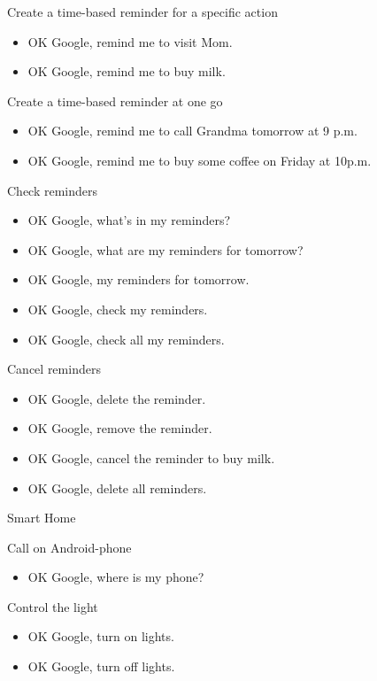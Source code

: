 \documentclass[
  a4paper,
]{article}
\providecommand{\tightlist}{%
  \setlength{\itemsep}{0pt}\setlength{\parskip}{0pt}}\usepackage{longtable,booktabs,array}
\begin{document}
Create a time-based reminder for a specific action

\begin{itemize}
\item
  OK Google, remind me to visit Mom.
\item
  OK Google, remind me to buy milk.
\end{itemize}

Create a time-based reminder at one go

\begin{itemize}
\item
  OK Google, remind me to call Grandma tomorrow at 9 p.m.
\item
  OK Google, remind me to buy some coffee on Friday at 10p.m.
\end{itemize}

Check reminders

\begin{itemize}
\item
  OK Google, what's in my reminders?
\item
  OK Google, what are my reminders for tomorrow?
\item
  OK Google, my reminders for tomorrow.
\item
  OK Google, check my reminders.
\item
  OK Google, check all my reminders.~~
\end{itemize}

Cancel reminders

\begin{itemize}
\item
  OK Google, delete the reminder.
\item
  OK Google, remove the reminder.
\item
  OK Google, cancel the reminder to buy milk.
\item
  OK Google, delete all reminders.
\end{itemize}

Smart Home

Call on Android-phone

\begin{itemize}
\tightlist
\item
  OK Google, where is my phone?
\end{itemize}

Control the light

\begin{itemize}
\item
  OK Google, turn on lights.
\item
  OK Google, turn off lights.
\end{itemize}
\end{document}

